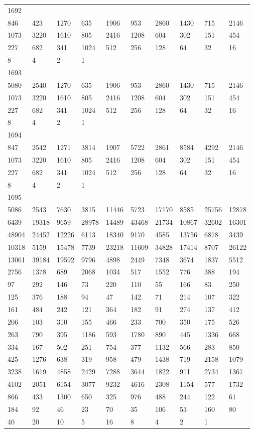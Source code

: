 \begin{longtable}{*{10}{l}}
1692&&&&&&&&&\\
846& 423& 1270& 635& 1906& 953& 2860& 1430& 715& 2146\\
1073& 3220& 1610& 805& 2416& 1208& 604& 302& 151& 454\\
227& 682& 341& 1024& 512& 256& 128& 64& 32& 16\\
8& 4& 2& 1& \\

1693&&&&&&&&&\\
5080& 2540& 1270& 635& 1906& 953& 2860& 1430& 715& 2146\\
1073& 3220& 1610& 805& 2416& 1208& 604& 302& 151& 454\\
227& 682& 341& 1024& 512& 256& 128& 64& 32& 16\\
8& 4& 2& 1& \\

1694&&&&&&&&&\\
847& 2542& 1271& 3814& 1907& 5722& 2861& 8584& 4292& 2146\\
1073& 3220& 1610& 805& 2416& 1208& 604& 302& 151& 454\\
227& 682& 341& 1024& 512& 256& 128& 64& 32& 16\\
8& 4& 2& 1& \\

1695&&&&&&&&&\\
5086& 2543& 7630& 3815& 11446& 5723& 17170& 8585& 25756& 12878\\
6439& 19318& 9659& 28978& 14489& 43468& 21734& 10867& 32602& 16301\\
48904& 24452& 12226& 6113& 18340& 9170& 4585& 13756& 6878& 3439\\
10318& 5159& 15478& 7739& 23218& 11609& 34828& 17414& 8707& 26122\\
13061& 39184& 19592& 9796& 4898& 2449& 7348& 3674& 1837& 5512\\
2756& 1378& 689& 2068& 1034& 517& 1552& 776& 388& 194\\
97& 292& 146& 73& 220& 110& 55& 166& 83& 250\\
125& 376& 188& 94& 47& 142& 71& 214& 107& 322\\
161& 484& 242& 121& 364& 182& 91& 274& 137& 412\\
206& 103& 310& 155& 466& 233& 700& 350& 175& 526\\
263& 790& 395& 1186& 593& 1780& 890& 445& 1336& 668\\
334& 167& 502& 251& 754& 377& 1132& 566& 283& 850\\
425& 1276& 638& 319& 958& 479& 1438& 719& 2158& 1079\\
3238& 1619& 4858& 2429& 7288& 3644& 1822& 911& 2734& 1367\\
4102& 2051& 6154& 3077& 9232& 4616& 2308& 1154& 577& 1732\\
866& 433& 1300& 650& 325& 976& 488& 244& 122& 61\\
184& 92& 46& 23& 70& 35& 106& 53& 160& 80\\
40& 20& 10& 5& 16& 8& 4& 2& 1& \\


\end{longtable}
